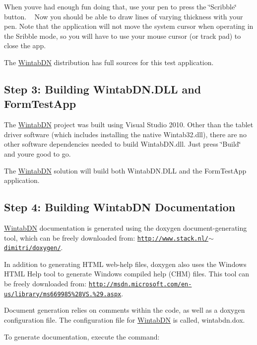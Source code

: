 When you\textquotesingle{}ve had enough fun doing that, use your pen to press the \char`\"{}\+Scribble\char`\"{} button. ~\newline
Now you should be able to draw lines of varying thickness with your pen. Note that the application will not move the system cursor when operating in the Sribble mode, so you will have to use your mouse cursor (or track pad) to close the app.

The \mbox{\hyperlink{namespace_wintab_d_n}{Wintab\+DN}} distribution has full sources for this test application.\hypertarget{page1_step3}{}\subsection{Step 3\+: Building Wintab\+D\+N.\+D\+L\+L and Form\+Test\+App}\label{page1_step3}
The \mbox{\hyperlink{namespace_wintab_d_n}{Wintab\+DN}} project was built using Visual Studio 2010. Other than the tablet driver software (which includes installing the native Wintab32.\+dll), there are no other software dependencies needed to build Wintab\+D\+N.\+dll. Just press \char`\"{}\+Build\char`\"{} and you\textquotesingle{}re good to go.

The \mbox{\hyperlink{namespace_wintab_d_n}{Wintab\+DN}} solution will build both Wintab\+D\+N.\+D\+LL and the Form\+Test\+App application.\hypertarget{page1_step4}{}\subsection{Step 4\+: Building Wintab\+D\+N Documentation}\label{page1_step4}
\mbox{\hyperlink{namespace_wintab_d_n}{Wintab\+DN}} documentation is generated using the doxygen document-\/generating tool, which can be freely downloaded from\+: \href{http://www.stack.nl/~dimitri/doxygen/}{\tt http\+://www.\+stack.\+nl/$\sim$dimitri/doxygen/}.

In addition to generating H\+T\+ML web-\/help files, doxygen also uses the Windows H\+T\+ML Help tool to generate Windows compiled help (C\+HM) files. This tool can be freely downloaded from\+: \href{http://msdn.microsoft.com/en-us/library/ms669985%28VS.85%29.aspx}{\tt http\+://msdn.\+microsoft.\+com/en-\/us/library/ms669985\%28\+V\+S.\+85\%29.\+aspx}.

Document generation relies on comments within the code, as well as a doxygen configuration file. The configuration file for \mbox{\hyperlink{namespace_wintab_d_n}{Wintab\+DN}} is called, wintabdn.\+dox.

To generate documentation, execute the command\+: \begin{DoxyParagraph}{}
{ } 
\end{DoxyParagraph}
